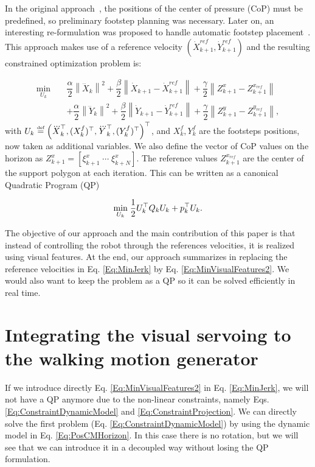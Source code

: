 In the original approach~\cite{Kajita2003}, the positions of the center of pressure (CoP) must be predefined, so preliminary footstep planning was necessary. Later on, an interesting re-formulation was proposed to handle automatic footstep placement~\cite{HerdtAR2010}. This approach makes use of a reference velocity $(\dot{X}_{k+1}^{ref},\dot{Y}_{k+1}^{ref})$ and the resulting constrained optimization problem is:

{\scriptsize
\begin{eqnarray}
\label{Eq:MinJerk}
\nonumber
 \underset{U_{k}}{\min} \; && \dfrac{\alpha}{2} \left\| \dddot{X}_k \right\|^2 + \dfrac{\beta}{2} \left\| \dot{X}_{k+1} - \dot{X}_{k+1}^{ref} \right\|
 + \dfrac{\gamma}{2} \left\| Z_{k+1}^x - Z_{k+1}^{x_{ref}} \right\| \\
 && + \dfrac{\alpha}{2} \left\| \dddot{Y}_k \right\|^2 + \dfrac{\beta}{2} \left\| \dot{Y}_{k+1} - \dot{Y}_{k+1}^{ref} \right\|
 + \dfrac{\gamma}{2} \left\| Z_{k+1}^y - Z_{k+1}^{y_{ref}} \right\|,
\end{eqnarray}
}
with $U_{k} \stackrel{\mbox{\tiny def}}{=}  \left( \dddot{X}^{\top}_k, (X_k^f)^{\top}, \dddot{Y}^{\top}_k, (Y_k^f)^{\top} \right)^{\top}$, and
 $X^f_k, Y^f_k$ are the footsteps positions, now taken as additional variables. 
We also define the vector of CoP values on the horizon as $Z_{k+1}^x = [ {\xi}^x_{k+1} \; \cdots \; {\xi}^x_{k+N}]$. 
The reference values $Z_{k+1}^{x_{ref}}$ are the center of the support polygon at each iteration.
This can be written as a canonical Quadratic Program (QP) 

\begin{equation*}
 \underset{U_k}{\min} \; \dfrac{1}{2} U_k^{\top} Q_k U_k + p_k^{\top} U_k.
\end{equation*}

The objective of our approach and the main contribution of this paper is that instead of controlling the robot through the references velocities, it is realized using visual features. At the end, our approach summarizes in replacing the reference velocities in Eq. \ref{Eq:MinJerk} by Eq. \ref{Eq:MinVisualFeatures2}. We would also want to keep the problem as a QP so it can be solved efficiently in real time.

\section{Integrating the visual servoing to the walking motion generator}
\label{sec:integration}
If we introduce directly Eq. \ref{Eq:MinVisualFeatures2} in Eq. \ref{Eq:MinJerk}, we will not have a QP anymore due to the non-linear constraints, namely Eqs. \ref{Eq:ConstraintDynamicModel} and \ref{Eq:ConstraintProjection}. We can directly solve the first problem (Eq. \ref{Eq:ConstraintDynamicModel}) by using the dynamic model in Eq. \ref{Eq:PosCMHorizon}. In this case there is no rotation, but we will see that we can introduce it in a decoupled way without losing the QP formulation.

